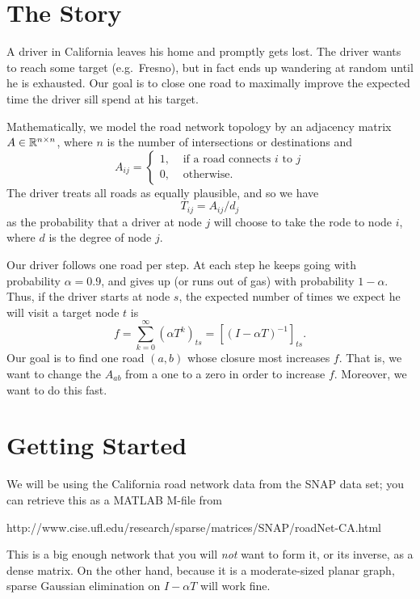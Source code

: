 \documentclass[12pt, leqno]{article}
\begin{document}
\section*{The Story}

A driver in California leaves his home and promptly gets lost.  The
driver wants to reach some target (e.g.~Fresno), but in fact ends up
wandering at random until he is exhausted.  Our goal is to close one
road to maximally improve the expected time the driver sill spend at
his target.

Mathematically, we model the road network topology by an adjacency
matrix $A \in \mathbb{R}^{n \times n}$, where $n$ is the number of
intersections or destinations and
\[
  A_{ij} =
  \begin{cases}
    1, & \mbox{ if a road connects $i$ to $j$} \\
    0, & \mbox{ otherwise}.
  \end{cases}
\]
The driver treats all roads as equally plausible, and so we have
\[
  T_{ij} = A_{ij}/d_j
\]
as the probability that a driver at node $j$ will choose to take
the rode to node $i$, where $d$ is the degree of node $j$.

Our driver follows one road per step.  At each step he keeps going
with probability $\alpha = 0.9$, and gives up (or runs out of gas) with
probability $1-\alpha$.  Thus, if the driver starts at node $s$,
the expected number of times we expect he will visit a target node
$t$ is
\[
  f = \sum_{k=0}^\infty (\alpha T^k)_{ts} = \left[ (I-\alpha T)^{-1} \right]_{ts}.
\]
Our goal is to find one road $(a,b)$ whose closure most increases $f$.
That is, we want to change the $A_{ab}$ from a one to a zero in order
to increase $f$.  Moreover, we want to do this fast.

\section*{Getting Started}

We will be using the California road network data from the SNAP data
set; you can retrieve this as a MATLAB M-file from
\begin{center}
  http://www.cise.ufl.edu/research/sparse/matrices/SNAP/roadNet-CA.html
\end{center}
This is a big enough network that you will {\em not} want to form it,
or its inverse, as a dense matrix.  On the other hand, because it is a
moderate-sized planar graph, sparse Gaussian elimination
on $I-\alpha T$ will work fine.
\end{document}
